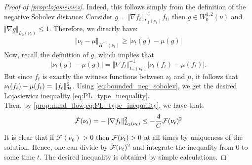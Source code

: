 \begin{proof}[Proof of \cref{prop:lojasiewicz}]\label{proof:prop:lojasiewicz}
	Indeed, this follows simply from the definition of the negative Sobolev distance: Consider $g = \Vert \nabla f_t\Vert^{-1}_{L_2(\nu_t)} f_t$, then $g\in W_0^{1,2}(\nu)$  and $\Vert \nabla g \Vert_{L_2(\nu_t)}\leq 1$. Therefore, we directly have:
	\begin{align}
	\Vert \nu_t - \mu\Vert_{\dot{H}^{-1}(\nu_t)}\geq \vert \nu_t(g) - \mu(g)  \vert
	\end{align}
	Now, recall the definition of $g$, which implies that
	\[
	\vert \nu_t(g) - \mu(g)  \vert = \Vert \nabla f_t\Vert^{-1}_{L_2(\nu_t)} \vert \nu_t(f_t)-\mu(f_t)\vert.
	\]
	But since $f_t$  is exactly the witness functions between $\nu_t$ and $\mu$, it follows that $\nu_t(f_t)-\mu(f_t) = \Vert f_t\Vert^2_{{{\mathcal H}}}$.
	Using \cref{eq:bounded_neg_sobolev}, we get the desired Lojasiewicz inequality \eqref{eq:PL_type_inequality}.\\
	
	Then, by \cref{prop:mmd_flow,eq:PL_type_inequality}, we have that:  
	\begin{align}
	\dot{{{\mathcal F}}}(\nu_t) = - \Vert \nabla f_t \Vert^2_{L_2(\nu_t)} \leq  -\frac{4}{C}{{\mathcal F}}(\nu_t)^2	
	\end{align}
	It is clear that if $\mathcal{F}(\nu_0)>0$ then ${{\mathcal F}}(\nu_t)>0$ at all times by uniqueness of the solution. Hence, one can divide by ${{\mathcal F}}(\nu_t)^2$ and integrate the inequality from $0$ to some time $t$. The desired inequality is obtained by simple calculations.
\end{proof}






%



